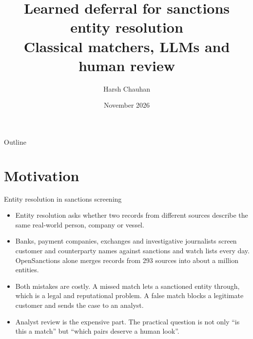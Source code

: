 \documentclass[aspectratio=169,10pt]{beamer}
\title[Learned deferral for sanctions ER]{Learned deferral for sanctions entity resolution\\\large Classical matchers, LLMs and human review}
\author{Harsh Chauhan}
\institute[IIT Dharwad]{Pattern Recognition and Machine Learning, course project\\Indian Institute of Technology Dharwad}
\date{November 2026}
\begin{document}
\begin{frame}[plain]
\titlepage
\end{frame}

\begin{frame}{Outline}
\tableofcontents
\end{frame}

\section{Motivation}

\begin{frame}{Entity resolution in sanctions screening}
\begin{itemize}
\item Entity resolution asks whether two records from different sources describe the same real-world person, company or vessel.
\item Banks, payment companies, exchanges and investigative journalists screen customer and counterparty names against sanctions and watch lists every day. OpenSanctions alone merges records from 293 sources into about a million entities.
\item Both mistakes are costly. A missed match lets a sanctioned entity through, which is a legal and reputational problem. A false match blocks a legitimate customer and sends the case to an analyst.
\item Analyst review is the expensive part. The practical question is not only ``is this a match'' but ``which pairs deserve a human look''.
\end{itemize}
\end{frame}
\end{document}
